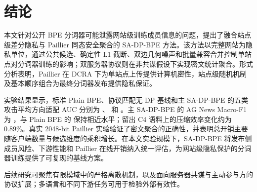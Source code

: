 \section{结论}

本文针对公开 BPE 分词器可能泄露网站级训练成员信息的问题，提出了融合站点级差分隐私与 Paillier 同态安全聚合的 SA-DP-BPE 方法。该方法以完整网站为隐私单位，通过公共候选、确定性 L1 截断、双边几何噪声和批量兼容合并控制单站点对分词器训练的影响；双服务器协议则在非共谋假设下实现密文统计聚合。形式分析表明，Paillier 在 DCRA 下为单站点上传提供计算机密性，站点级随机机制及基本顺序组合为最终分词器发布提供隐私保证。

实验结果显示，标准 Plain BPE、协议匹配无 DP 基线和主 SA-DP-BPE 的五类攻击平均方向适配 AUC 分别为 \PlainAdaptedAUC、\ProtocolBaselineAdaptedAUC{} 和 \PrimaryAdaptedAUC。主 SA-DP-BPE 的 AG News Macro-F1 为 \PrimaryMacroFOne，与 Plain BPE 的 \PlainMacroFOne{} 保持相近水平；留出 C4 语料上的压缩效率变化约为 0.89\%。真实 2048-bit Paillier 实验验证了密文聚合的正确性，并表明总开销主要随客户端数量与候选维度的乘积增长。在本文实验规模下，SA-DP-BPE 将发布侧成员风险、下游性能和 Paillier 在线开销纳入统一评估，为网站级隐私保护的分词器训练提供了可复现的基线方案。

后续研究可聚焦有限模域中的严格离散机制，以及面向服务器共谋与主动参与方的协议扩展；多语言和不同下游任务可用于检验外部有效性。
